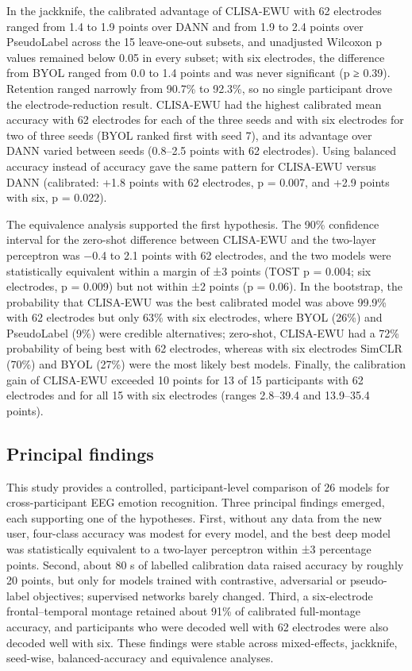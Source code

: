 In the jackknife, the calibrated advantage of CLISA-EWU with 62 electrodes ranged from 1.4 to 1.9 points over DANN and from 1.9 to 2.4 points over PseudoLabel across the 15 leave-one-out subsets, and unadjusted Wilcoxon p values remained below 0.05 in every subset; with six electrodes, the difference from BYOL ranged from 0.0 to 1.4 points and was never significant (p ≥ 0.39). Retention ranged narrowly from 90.7\% to 92.3\%, so no single participant drove the electrode-reduction result. CLISA-EWU had the highest calibrated mean accuracy with 62 electrodes for each of the three seeds and with six electrodes for two of three seeds (BYOL ranked first with seed 7), and its advantage over DANN varied between seeds (0.8–2.5 points with 62 electrodes). Using balanced accuracy instead of accuracy gave the same pattern for CLISA-EWU versus DANN (calibrated: +1.8 points with 62 electrodes, p = 0.007, and +2.9 points with six, p = 0.022).

The equivalence analysis supported the first hypothesis. The 90\% confidence interval for the zero-shot difference between CLISA-EWU and the two-layer perceptron was −0.4 to 2.1 points with 62 electrodes, and the two models were statistically equivalent within a margin of ±3 points (TOST p = 0.004; six electrodes, p = 0.009) but not within ±2 points (p = 0.06). In the bootstrap, the probability that CLISA-EWU was the best calibrated model was above 99.9\% with 62 electrodes but only 63\% with six electrodes, where BYOL (26\%) and PseudoLabel (9\%) were credible alternatives; zero-shot, CLISA-EWU had a 72\% probability of being best with 62 electrodes, whereas with six electrodes SimCLR (70\%) and BYOL (27\%) were the most likely best models. Finally, the calibration gain of CLISA-EWU exceeded 10 points for 13 of 15 participants with 62 electrodes and for all 15 with six electrodes (ranges 2.8–39.4 and 13.9–35.4 points).


\subsection{Principal findings}
This study provides a controlled, participant-level comparison of 26 models for cross-participant EEG emotion recognition. Three principal findings emerged, each supporting one of the hypotheses. First, without any data from the new user, four-class accuracy was modest for every model, and the best deep model was statistically equivalent to a two-layer perceptron within ±3 percentage points. Second, about 80 s of labelled calibration data raised accuracy by roughly 20 points, but only for models trained with contrastive, adversarial or pseudo-label objectives; supervised networks barely changed. Third, a six-electrode frontal–temporal montage retained about 91\% of calibrated full-montage accuracy, and participants who were decoded well with 62 electrodes were also decoded well with six. These findings were stable across mixed-effects, jackknife, seed-wise, balanced-accuracy and equivalence analyses.


